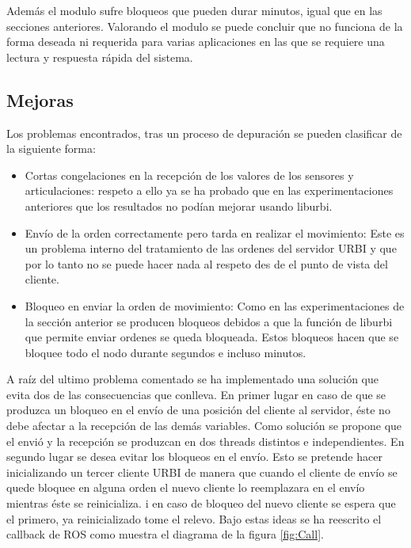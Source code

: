 \documentclass[12pt,a4paper,final,twoside]{book}
\begin{document}
Además el modulo sufre bloqueos que pueden durar minutos, igual que en las secciones anteriores.
Valorando el modulo se puede concluir que no funciona de la forma deseada ni requerida para varias aplicaciones en las que se requiere una lectura y respuesta rápida del sistema. 

\subsection{Mejoras}
Los problemas encontrados, tras un proceso de depuración se pueden clasificar de la siguiente forma:
\begin{itemize}
\item Cortas congelaciones en la recepción de los valores de los sensores y articulaciones: respeto a ello ya se ha probado que en las experimentaciones anteriores que los resultados no podían mejorar usando liburbi.
\item Envío de la orden correctamente pero tarda en realizar el movimiento: Este es un problema interno del tratamiento de las ordenes del servidor URBI y que por lo tanto no se puede hacer nada al respeto des de el punto de vista del cliente.
\item Bloqueo en enviar la orden de movimiento: Como en las experimentaciones de la sección anterior se producen bloqueos debidos a que la función de liburbi que permite enviar ordenes se queda bloqueada. Estos bloqueos hacen que se bloquee todo el nodo durante segundos e incluso minutos.
\end{itemize}

A raíz del ultimo problema comentado se ha implementado una solución que evita dos de las consecuencias que conlleva.
En primer lugar en caso de que se produzca un bloqueo en el envío de una posición del cliente al servidor, éste no debe afectar a la recepción de las demás variables. Como solución se propone que el envió y la recepción se produzcan en dos threads distintos e independientes. 
En segundo lugar se desea evitar los bloqueos en el envío. Esto se pretende hacer inicializando un tercer cliente URBI de manera que cuando el cliente de envío se quede bloquee en alguna orden el nuevo cliente lo reemplazara en el envío mientras éste se reinicializa. i en caso de bloqueo del nuevo cliente se espera que el primero, ya reinicializado tome el relevo.
Bajo estas ideas se ha reescrito el callback de ROS como muestra el diagrama de la figura \ref{fig:Call}.
\end{document}
